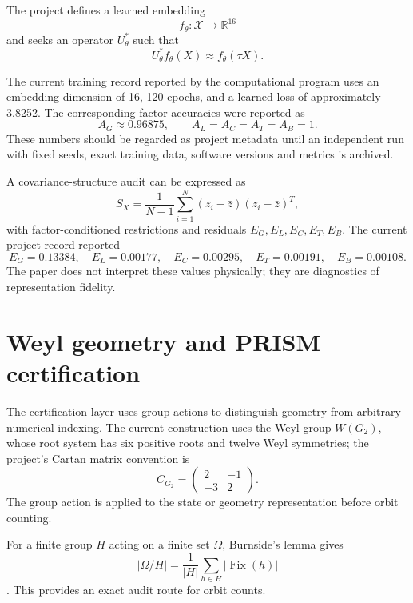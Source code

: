 \documentclass[11pt,a4paper]{article}
\numberwithin{equation}{section}
\newcommand{\R}{\mathbb{R}}
\newcommand{\XX}{\mathcal{X}}
\newcommand{\Fix}{\operatorname{Fix}}
\begin{document}
The project defines a learned embedding
\begin{equation}
f_\theta:\XX\rightarrow\R^{16}
\end{equation}
and seeks an operator $U_\theta^*$ such that
\begin{equation}
U_\theta^* f_\theta(X)\approx f_\theta(\tau X).
\label{eq:qvsm-operator}
\end{equation}

The current training record reported by the computational program uses an embedding dimension of 16, 120 epochs, and a learned loss of approximately 3.8252. The corresponding factor accuracies were reported as
\[
A_G\approx0.96875,
\qquad
A_L=A_C=A_T=A_B=1.
\]
These numbers should be regarded as project metadata until an independent run with fixed seeds, exact training data, software versions and metrics is archived.

A covariance-structure audit can be expressed as
\begin{equation}
S_X=\frac{1}{N-1}\sum_{i=1}^{N}(z_i-\bar z)(z_i-\bar z)^T,
\end{equation}
with factor-conditioned restrictions and residuals $E_G,E_L,E_C,E_T,E_B$. The current project record reported
\[
E_G=0.13384,\quad
E_L=0.00177,\quad
E_C=0.00295,\quad
E_T=0.00191,\quad
E_B=0.00108.
\]
The paper does not interpret these values physically; they are diagnostics of representation fidelity.

\section{Weyl geometry and PRISM certification}
\label{sec:prism}

The certification layer uses group actions to distinguish geometry from arbitrary numerical indexing. The current construction uses the Weyl group $W(G_2)$, whose root system has six positive roots and twelve Weyl symmetries; the project's Cartan matrix convention is
\begin{equation}
C_{G_2}=\begin{pmatrix}2&-1\\-3&2\end{pmatrix}.
\end{equation}
The group action is applied to the state or geometry representation before orbit counting.

For a finite group $H$ acting on a finite set $\Omega$, Burnside's lemma gives
\begin{equation}
|\Omega/H|
=
\frac{1}{|H|}
\sum_{h\in H}|\Fix(h)|
\label{eq:burnside}
\end{equation}
\citep{Burnside1897,StanfordBurnside}. This provides an exact audit route for orbit counts.
\end{document}
